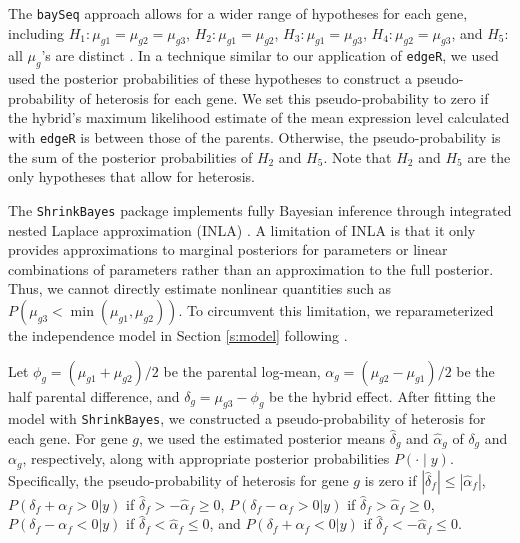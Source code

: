 \documentclass[useAMS,usenatbib,referee]{biom}
\begin{document}
The {\tt baySeq} approach allows for a wider range of hypotheses for each gene, including $H_1: \mu_{g1}=\mu_{g2}=\mu_{g3}$, $H_2: \mu_{g1}=\mu_{g2}$, $H_3: \mu_{g1}=\mu_{g3}$, $H_4: \mu_{g2}=\mu_{g3}$, and $H_5:$ all $\mu_g$'s are distinct \citep{hardcastle2010bayseq, hardcastle2012baySeq}. In a technique similar to our application of {\tt edgeR}, we used used the posterior probabilities of these hypotheses to construct a pseudo-probability of heterosis for each gene. We set this pseudo-probability to zero if the hybrid's maximum likelihood estimate of the mean expression level calculated with {\tt edgeR} is between those of the parents. Otherwise, the pseudo-probability is the sum of the posterior probabilities of $H_2$ and $H_5$. Note that $H_2$ and $H_5$ are the only hypotheses that allow for heterosis.

The {\tt ShrinkBayes} package implements fully Bayesian inference through integrated nested Laplace approximation (INLA) \citep{rue2009approximate,van2014shrinkbayes}. A limitation of INLA is that it only provides approximations to marginal posteriors for parameters or linear combinations of parameters rather than an approximation to the full posterior. Thus, we cannot directly estimate nonlinear quantities such as $P(\mu_{g3} < \min(\mu_{g1},\mu_{g2}))$. To circumvent this limitation, we reparameterized the independence model in Section \ref{s:model} following \cite{ji2014estimation}. 



 Let $\phi_g = (\mu_{g1}+\mu_{g2})/2$ be the parental log-mean, $\alpha_g = (\mu_{g2}-\mu_{g1})/2$ be the half parental difference, and $\delta_g = \mu_{g3} - \phi_g$ be the hybrid effect. After fitting the model with {\tt ShrinkBayes}, we constructed a pseudo-probability of heterosis for each gene. For gene $g$, we used the estimated posterior means $\hat{\delta}_g$ and $\hat{\alpha}_g$ of $\delta_g$ and $\alpha_g$, respectively, along with appropriate posterior probabilities $P(\cdot \mid y)$. Specifically, the pseudo-probability of heterosis for gene $g$ is zero if $|\hat{\delta}_f| \le |\hat{\alpha}_f|$, $P(\delta_f + \alpha_f > 0 |y)$ if $\hat{\delta}_f > -\hat{\alpha}_f \ge 0$, $P(\delta_f - \alpha_f > 0 |y)$ if $\hat{\delta}_f > \hat{\alpha}_f \ge 0$, $P(\delta_f - \alpha_f < 0 |y)$ if $\hat{\delta}_f < \hat{\alpha}_f \le 0$, and $P(\delta_f + \alpha_f < 0 |y)$ if $\hat{\delta}_f < -\hat{\alpha}_f \le 0$.  
\end{document}
